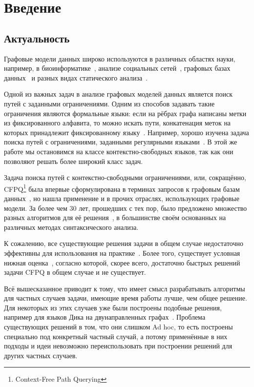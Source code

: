 \section*{Введение}

\subsection*{Актуальность}

Графовые модели данных широко используются в различных областях науки, например, в биоинформатике~\cite{Sevon08}, анализе социальных сетей~\cite{Zarrinkalam14, Chaudhary16}, графовых базах данных~\cite{Medeiros18,Yannakakis1990} и разных видах статического анализа~\cite{Reps1998}. 

Одной из важных задач в анализе графовых моделей данных является поиск путей с заданными ограничениями. Одним из способов задавать такие ограничения являются формальные языки: если на рёбрах графа написаны метки из фиксированного алфавита, то можно искать пути, конкатенация меток на которых принадлежит фиксированному языку~\cite{Barrett00}. Например, хорошо изучена задача поиска путей с ограничениями, заданными регулярными языками~\cite{Mendelzon1995}. В этой же работе мы остановимся на классе контекстно-свободных языков, так как они позволяют решать более широкий класс задач.

Задача поиска путей с контекстно-свободными ограничениями, или, сокращённо, CFPQ\footnote{Context-Free Path Querying} была впервые сформулирована в терминах запросов к графовым базам данных~\cite{Yannakakis1990}, но нашла применение и в прочих отраслях, использующих графовые модели. За более чем 30 лет, прошедших с тех пор, было предложено множество разных алгоритмов для её решения~\cite{Reps97, Hellings15, Santos18}, в большинстве своём основанных на различных методах синтаксического анализа. 

К сожалению, все существующие решения задачи в общем случае недостаточно эффективны для использования на практике~\cite{Kuijpers19}. Более того, существует условная нижная оценка~\cite{Heintze1997}, согласно которой, скорее всего, достаточно быстрых решений задачи CFPQ в общем случае и не существует.

Всё вышесказанное приводит к тому, что имеет смысл разрабатывать алгоритмы для частных случаев задачи, имеющие время работы лучше, чем общее решение. Для некоторых из этих случаев уже были построены подобные решения, например для языков Дика на двунаправленных графах~\cite{Yuan09,Chatterjee17}. Проблема существующих решений в том, что они слишком Ad hoc, то есть построены специально под конкретный частный случай, а потому применённые в них подходы и идеи невозможно переиспользовать при построении решений для других частных случаев.  

